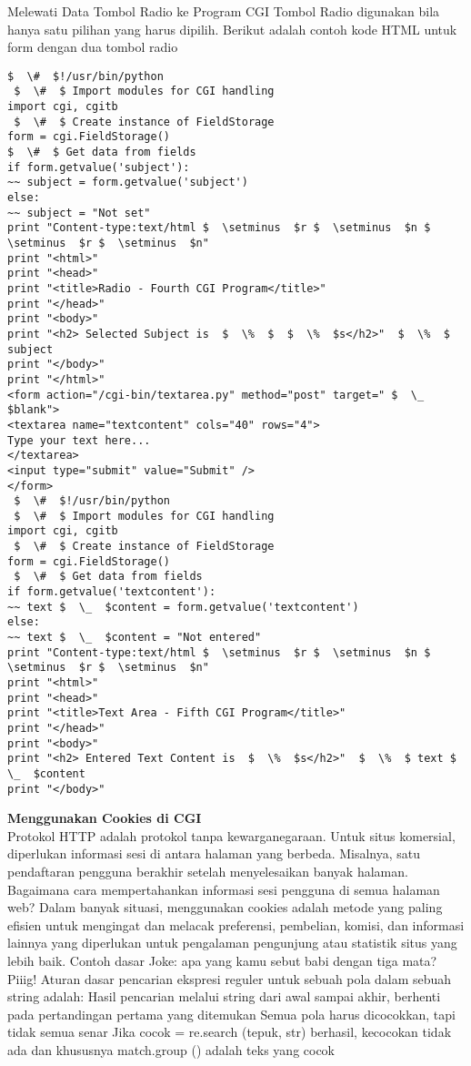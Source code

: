 \begin {enumerate}
\begin {enumerate}
Melewati Data Tombol Radio ke Program CGI
Tombol Radio digunakan bila hanya satu pilihan yang harus dipilih.
Berikut adalah contoh kode HTML untuk form dengan dua tombol radio
\begin{verbatim}
$  \#  $!/usr/bin/python
 $  \#  $ Import modules for CGI handling
import cgi, cgitb
 $  \#  $ Create instance of FieldStorage
form = cgi.FieldStorage()
$  \#  $ Get data from fields
if form.getvalue('subject'):
~~ subject = form.getvalue('subject')
else:
~~ subject = "Not set"
print "Content-type:text/html $  \setminus  $r $  \setminus  $n $  \setminus  $r $  \setminus  $n"
print "<html>"
print "<head>"
print "<title>Radio - Fourth CGI Program</title>"
print "</head>"
print "<body>"
print "<h2> Selected Subject is  $  \%  $  $  \%  $s</h2>"  $  \%  $ subject
print "</body>"
print "</html>"
<form action="/cgi-bin/textarea.py" method="post" target=" $  \_  $blank">
<textarea name="textcontent" cols="40" rows="4">
Type your text here...
</textarea>
<input type="submit" value="Submit" />
</form>
 $  \#  $!/usr/bin/python
 $  \#  $ Import modules for CGI handling
import cgi, cgitb
 $  \#  $ Create instance of FieldStorage
form = cgi.FieldStorage()
 $  \#  $ Get data from fields
if form.getvalue('textcontent'):
~~ text $  \_  $content = form.getvalue('textcontent')
else:
~~ text $  \_  $content = "Not entered"
print "Content-type:text/html $  \setminus  $r $  \setminus  $n $  \setminus  $r $  \setminus  $n"
print "<html>"
print "<head>"
print "<title>Text Area - Fifth CGI Program</title>"
print "</head>"
print "<body>"
print "<h2> Entered Text Content is  $  \%  $s</h2>"  $  \%  $ text $  \_  $content
print "</body>"
\end{verbatim}
{\fontsize{14pt}{14pt}\selectfont \textbf{Menggunakan Cookies di CGI} \\}
Protokol HTTP adalah protokol tanpa kewarganegaraan. Untuk situs komersial, diperlukan informasi sesi di antara halaman yang berbeda. Misalnya, satu pendaftaran pengguna berakhir setelah menyelesaikan banyak halaman. Bagaimana cara mempertahankan informasi sesi pengguna di semua halaman web? Dalam banyak situasi, menggunakan cookies adalah metode yang paling efisien untuk mengingat dan melacak preferensi, pembelian, komisi, dan informasi lainnya yang diperlukan untuk pengalaman pengunjung atau statistik situs yang lebih baik.
Contoh dasar
Joke: apa yang kamu sebut babi dengan tiga mata? Piiig!
Aturan dasar pencarian ekspresi reguler untuk sebuah pola dalam sebuah string adalah:
Hasil pencarian melalui string dari awal sampai akhir, berhenti pada pertandingan pertama yang ditemukan  Semua pola harus dicocokkan, tapi tidak semua senar Jika cocok = re.search (tepuk, str) berhasil, kecocokan tidak ada dan khususnya match.group () adalah teks yang cocok

\end{enumerate}
\end{enumerate}

